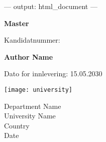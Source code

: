 ---
output: html_document
---

\begin{titlepage}
    \begin{center}
        \vspace*{1cm}
 
        \Huge
        \textbf{Master}
 
        \vspace{0.5cm}
        \LARGE
        Kandidatnummer: 
 
        \vspace{1.5cm}
 
        \textbf{Author Name}
 
        \vfill
 
        Dato for innlevering: 15.05.2030
 
        \vspace{0.8cm}
 
        \texttt{[image: university]}
 
        \Large
        Department Name\\
        University Name\\
        Country\\
        Date
 
    \end{center}
    \thispagestyle{empty}
\end{titlepage}